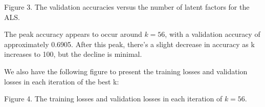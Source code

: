 \documentclass[letterpaper]{article}
\begin{document}
{\centering
Figure 3. The validation accuracies versus the number of latent factors for the ALS.
\par}


\bigskip

The peak accuracy appears to occur around  $k=56$, with a validation accuracy of approximately 0.6905. After this peak,
there's a slight decrease in accuracy as k increases to 100, but the decline is minimal.


\bigskip

We also have the following figure to present the training losses and validation losses in each iteration of the best k: 




{\centering
Figure 4. The training losses and validation losses in each iteration of  $k=56$.
\par}


\end{document}
